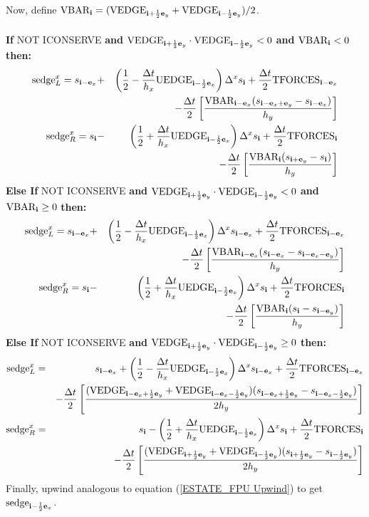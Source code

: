 Now, define $\text{VBAR}_{{\bf i}} = (\text{VEDGE}_{{\bf i}+\frac{1}{2}{\bf e}_y}+\text{VEDGE}_{{\bf i}-\frac{1}{2}{\bf e}_y})/2$.\\ \\
{\bf If} NOT ICONSERVE {\bf and} $\text{VEDGE}_{{\bf i}+\frac{1}{2}{\bf e}_y}\cdot\text{VEDGE}_{{\bf i}-\frac{1}{2}{\bf e}_y} < 0$ {\bf and} $\text{VBAR}_{{\bf i}} < 0$ {\bf then:}
\begin{eqnarray}
\text{sedge}_L^x = s_{{\bf i}-{\bf e}_x} &+& \left(\frac{1}{2} - \frac{\Delta t}{h_x}\text{UEDGE}_{{\bf i}-\frac{1}{2}{\bf e}_x}\right)\Delta^x s_{{\bf i}} + \frac{\Delta t}{2}\text{TFORCES}_{{\bf i}-{\bf e}_x} \nonumber\\
&& - \frac{\Delta t}{2}\left[\frac{\text{VBAR}_{{\bf i}-{\bf e}_x}(s_{{\bf i}-{\bf e}_x+{\bf e}_y}-s_{{\bf i}-{\bf e}_x})}{h_y}\right] \label{transverse upwinding 1} \\
\text{sedge}_R^x = s_{{\bf i}} &-& \left(\frac{1}{2} + \frac{\Delta t}{h_x}\text{UEDGE}_{{\bf i}-\frac{1}{2}{\bf e}_x}\right)\Delta^x s_{{\bf i}} + \frac{\Delta t}{2}\text{TFORCES}_{{\bf i}} \nonumber\\
&& - \frac{\Delta t}{2}\left[\frac{\text{VBAR}_{{\bf i}}(s_{{\bf i}+{\bf e}_y}-s_{{\bf i}})}{h_y}\right]
\end{eqnarray}
{\bf Else If} NOT ICONSERVE {\bf and} $\text{VEDGE}_{{\bf i}+\frac{1}{2}{\bf e}_y}\cdot\text{VEDGE}_{{\bf i}-\frac{1}{2}{\bf e}_y} < 0$ {\bf and} $\text{VBAR}_{{\bf i}} \ge 0$ {\bf then:}
\begin{eqnarray}
\text{sedge}_L^x = s_{{\bf i}-{\bf e}_x} &+& \left(\frac{1}{2} - \frac{\Delta t}{h_x}\text{UEDGE}_{{\bf i}-\frac{1}{2}{\bf e}_x}\right)\Delta^x s_{{\bf i}-{\bf e}_x} + \frac{\Delta t}{2}\text{TFORCES}_{{\bf i}-{\bf e}_x} \nonumber\\
&& - \frac{\Delta t}{2}\left[\frac{\text{VBAR}_{{\bf i}-{\bf e}_x}(s_{{\bf i}-{\bf e}_x}-s_{{\bf i}-{\bf e}_x-{\bf e}_y})}{h_y}\right] \\
\text{sedge}_R^x = s_{{\bf i}} &-& \left(\frac{1}{2} + \frac{\Delta t}{h_x}\text{UEDGE}_{{\bf i}-\frac{1}{2}{\bf e}_x}\right)\Delta^x s_{{\bf i}} + \frac{\Delta t}{2}\text{TFORCES}_{{\bf i}} \nonumber\\
&& - \frac{\Delta t}{2}\left[\frac{\text{VBAR}_{{\bf i}}(s_{{\bf i}}-s_{{\bf i}-{\bf e}_y})}{h_y}\right]
\end{eqnarray}
{\bf Else If} NOT ICONSERVE {\bf and} $\text{VEDGE}_{{\bf i}+\frac{1}{2}{\bf e}_y}\cdot\text{VEDGE}_{{\bf i}-\frac{1}{2}{\bf e}_y} \ge 0$ {\bf then:}
\begin{eqnarray}
\text{sedge}_L^x &=& s_{{\bf i}-{\bf e}_x} + \left(\frac{1}{2} - \frac{\Delta t}{h_x}\text{UEDGE}_{{\bf i}-\frac{1}{2}{\bf e}_x}\right)\Delta^x s_{{\bf i}-{\bf e}_x} + \frac{\Delta t}{2}\text{TFORCES}_{{\bf i}-{\bf e}_x} \nonumber\\
&& - \frac{\Delta t}{2}\left[\frac{(\text{VEDGE}_{{\bf i}-{\bf e}_x+\frac{1}{2}{\bf e}_y}+\text{VEDGE}_{{\bf i}-{\bf e}_x-\frac{1}{2}{\bf e}_y})(s_{{\bf i}-{\bf e}_x+\frac{1}{2}{\bf e}_y}-s_{{\bf i}-{\bf e}_x-\frac{1}{2}{\bf e}_y})}{2h_y}\right] \\
\text{sedge}_R^x &=& s_{{\bf i}} - \left(\frac{1}{2} + \frac{\Delta t}{h_x}\text{UEDGE}_{{\bf i}-\frac{1}{2}{\bf e}_x}\right)\Delta^x s_{{\bf i}} + \frac{\Delta t}{2}\text{TFORCES}_{{\bf i}} \nonumber\\
&& - \frac{\Delta t}{2}\left[\frac{(\text{VEDGE}_{{\bf i}+\frac{1}{2}{\bf e}_y}+\text{VEDGE}_{{\bf i}-\frac{1}{2}{\bf e}_y})(s_{{\bf i}+\frac{1}{2}{\bf e}_y}-s_{{\bf i}-\frac{1}{2}{\bf e}_y})}{2h_y}\right]\label{transverse upwinding 6}
\end{eqnarray}
Finally, upwind analogous to equation (\ref{ESTATE_FPU Upwind}) to get $\text{sedge}_{{\bf i}-\frac{1}{2}{\bf e}_x}$.


